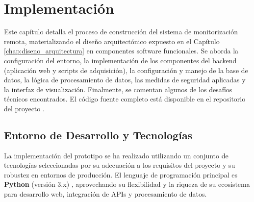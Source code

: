 \chapter{Implementación}
\label{chap:implementacion}

Este capítulo detalla el proceso de construcción del sistema de monitorización remota, materializando el diseño arquitectónico expuesto en el Capítulo \ref{chap:diseno_arquitectura} en componentes software funcionales. Se aborda la configuración del entorno, la implementación de los componentes del backend (aplicación web y scripts de adquisición), la configuración y manejo de la base de datos, la lógica de procesamiento de datos, las medidas de seguridad aplicadas y la interfaz de visualización. Finalmente, se comentan algunos de los desafíos técnicos encontrados. El código fuente completo está disponible en el repositorio del proyecto \citep{github_repo_proyecto}.

\section{Entorno de Desarrollo y Tecnologías}
\label{sec:impl_entorno}

La implementación del prototipo se ha realizado utilizando un conjunto de tecnologías seleccionadas por su adecuación a los requisitos del proyecto y su robustez en entornos de producción. El lenguaje de programación principal es \textbf{Python} (versión 3.x) \citep{python_website}, aprovechando su flexibilidad y la riqueza de su ecosistema para desarrollo web, integración de APIs y procesamiento de datos.


